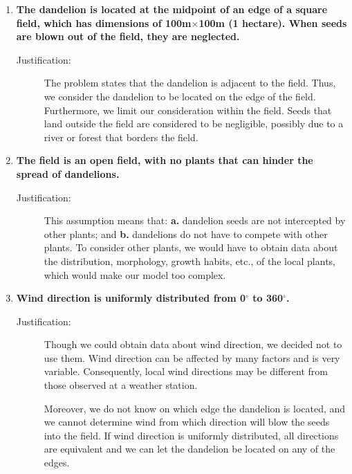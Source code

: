 \documentclass[12pt]{article}
\begin{document}
		\begin{enumerate}
			
			\item \textbf{The dandelion is located at the midpoint of an edge of a square field, which has dimensions of 100m$\times$100m (1 hectare).  When seeds are blown out of the field, they are neglected.}
			\vspace{-0.125in}
			\begin{description}
				\item[Justification:] The problem states that the dandelion is adjacent to the field.  Thus, we consider the dandelion to be located on the edge of the field.  Furthermore, we limit our consideration within the field.  Seeds that land outside the field are considered to be negligible, possibly due to a river or forest that borders the field.
			\end{description}
			
			\item \textbf{The field is an open field, with no plants that can hinder the spread of dandelions.}
			\vspace{-0.125in}
			\begin{description}
				\item[Justification:] This assumption means that: \textbf{a.} dandelion seeds are not intercepted by other plants; and \textbf{b.} dandelions do not have to compete with other plants.  To consider other plants, we would have to obtain data about the distribution, morphology, growth habits, etc., of the local plants, which would make our model too complex.
			\end{description}
			
			\item \textbf{Wind direction is uniformly distributed from 0$^\circ$ to 360$^\circ$.}
			\vspace{-0.125in}
			\begin{description}
				\item[Justification:] \label{assumption:wind} Though we could obtain data about wind direction, we decided not to use them.  Wind direction can be affected by many factors and is very variable.  Consequently, local wind directions may be different from those observed at a weather station.
				
				Moreover, we do not know on which edge the dandelion is located, and we cannot determine wind from which direction will blow the seeds into the field.  If wind direction is uniformly distributed, all directions are equivalent and we can let the dandelion be located on any of the edges.
			\end{description}
			

\end{enumerate}
\end{document}
